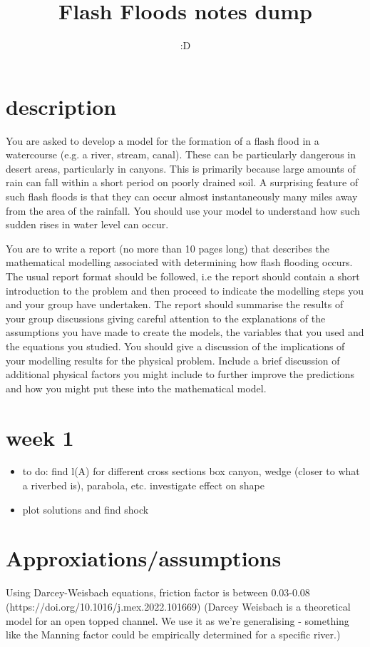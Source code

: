\documentclass[12pt]{article}
\title{Flash Floods notes dump}
\author{:D}
\begin{document}
\maketitle
\section{description}
You are asked to develop a model for the formation of a flash flood in a watercourse (e.g.
a river, stream, canal). These can be particularly dangerous in desert areas, particularly in
canyons. This is primarily because large amounts of rain can fall within a short period on
poorly drained soil. A surprising feature of such flash floods is that they can occur almost
instantaneously many miles away from the area of the rainfall. You should use your model
to understand how such sudden rises in water level can occur.

You are to write a report (no more than 10 pages long) that describes the mathematical
modelling associated with determining how flash flooding occurs. The usual report format
should be followed, i.e the report should contain a short introduction to the problem and
then proceed to indicate the modelling steps you and your group have undertaken. The
report should summarise the results of your group discussions giving careful attention to the
explanations of the assumptions you have made to create the models, the variables that you
used and the equations you studied. You should give a discussion of the implications of your
modelling results for the physical problem. Include a brief discussion of additional physical
factors you might include to further improve the predictions and how you might put these
into the mathematical model.
\section{week 1}
\begin{itemize}
    \item to do: find l(A) for different cross sections
box canyon, wedge (closer to what a riverbed is), parabola, etc. investigate effect on shape
    \item plot solutions and find shock
\end{itemize}

\section{Approxiations/assumptions}
Using Darcey-Weisbach equations, friction factor is between 0.03-0.08 (https://doi.org/10.1016/j.mex.2022.101669) (Darcey Weisbach is a theoretical model for an open topped channel. We use it as we're generalising - something like the Manning factor could be empirically determined for a specific river.)
\end{document}
